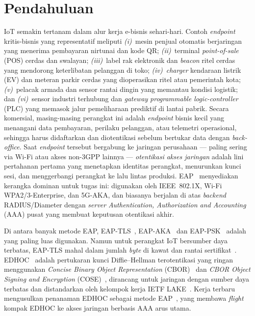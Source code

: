\documentclass{easychair}
\begin{document}
\section{Pendahuluan}
\label{Introduction}
IoT semakin tertanam dalam alur kerja e-bisnis sehari-hari.
Contoh \emph{endpoint} kritis-bisnis yang representatif meliputi
\emph{(i)}~mesin penjual otomatis berjaringan yang menerima pembayaran
nirtunai dan kode QR;
\emph{(ii)}~terminal \emph{point-of-sale} (POS) cerdas dan swalayan;
\emph{(iii)}~label rak elektronik dan \emph{beacon} ritel cerdas yang
mendorong keterlibatan pelanggan di toko;
\emph{(iv)}~\emph{charger} kendaraan listrik (EV) dan meteran parkir
cerdas yang dioperasikan ritel atau pemerintah kota;
\emph{(v)}~pelacak armada dan sensor rantai dingin yang memantau
kondisi logistik; dan
\emph{(vi)}~sensor industri terhubung dan \emph{gateway}
\emph{programmable logic-controller} (PLC) yang memasok jalur
pemeliharaan prediktif di lantai pabrik.
Secara komersial, masing-masing perangkat ini adalah \emph{endpoint}
bisnis kecil yang menangani data pembayaran, perilaku pelanggan,
atau telemetri operasional, sehingga harus didaftarkan dan
diotentikasi sebelum bertukar data dengan \emph{back-office}. Saat
\emph{endpoint} tersebut bergabung ke jaringan perusahaan ---
paling sering via Wi-Fi atau akses non-3GPP lainnya ---
\emph{otentikasi akses jaringan} adalah lini pertahanan pertama yang
menetapkan identitas perangkat, menurunkan kunci sesi, dan
menggerbangi perangkat ke lalu lintas produksi. EAP~\cite{RFC3748}
menyediakan kerangka dominan untuk tugas ini: digunakan oleh
IEEE~802.1X, Wi-Fi WPA2/3-Enterprise, dan 5G-AKA, dan biasanya
berjalan di atas \emph{backend} RADIUS/Diameter dengan \emph{server}
\emph{Authentication, Authorization and Accounting} (AAA) pusat
yang membuat keputusan otentikasi akhir.

Di antara banyak metode EAP, EAP-TLS~\cite{RFC5216},
EAP-AKA~\cite{RFC4187} dan EAP-PSK~\cite{RFC4764} adalah yang paling
luas digunakan. Namun untuk perangkat IoT bersumber daya terbatas,
EAP-TLS mahal dalam jumlah \emph{byte} di kawat dan rantai
sertifikat~\cite{FVW24,LopezGomez2026}. EDHOC~\cite{RFC9528,RFC9529}
adalah pertukaran kunci Diffie--Hellman terotentikasi yang ringan
menggunakan \emph{Concise Binary Object Representation}
(CBOR)~\cite{RFC8949} dan \emph{CBOR Object Signing and Encryption}
(COSE)~\cite{RFC9052}, dirancang untuk jaringan dengan sumber daya
terbatas dan distandarkan oleh kelompok kerja IETF LAKE~\cite{LAKE}.
Kerja terbaru mengusulkan penanaman EDHOC sebagai metode
EAP~\cite{RFC-EAP-EDHOC,LopezGomez2026}, yang membawa \emph{flight}
kompak EDHOC ke akses jaringan berbasis AAA arus utama.
\end{document}
